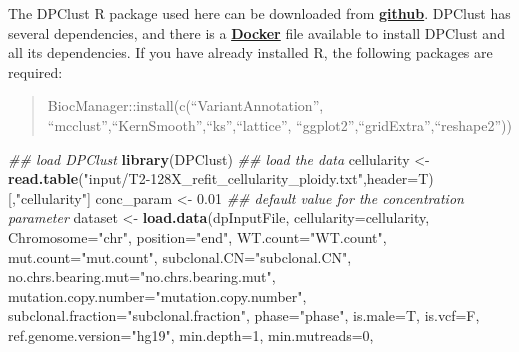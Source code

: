 \documentclass[]{article}
\newenvironment{Shaded}{\begin{snugshade}}{\end{snugshade}}
\newcommand{\CommentTok}[1]{\textcolor[rgb]{0.56,0.35,0.01}{\textit{#1}}}
\newcommand{\DataTypeTok}[1]{\textcolor[rgb]{0.13,0.29,0.53}{#1}}
\newcommand{\DecValTok}[1]{\textcolor[rgb]{0.00,0.00,0.81}{#1}}
\newcommand{\FloatTok}[1]{\textcolor[rgb]{0.00,0.00,0.81}{#1}}
\newcommand{\KeywordTok}[1]{\textcolor[rgb]{0.13,0.29,0.53}{\textbf{#1}}}
\newcommand{\NormalTok}[1]{#1}
\newcommand{\StringTok}[1]{\textcolor[rgb]{0.31,0.60,0.02}{#1}}
\begin{document}
The DPClust R package used here can be downloaded from
\href{https://github.com/Wedge-Oxford/dpclust_smchet_docker/blob/master/dpclust_v2.2.5.tar.gz}{\textbf{github}}.
DPClust has several dependencies, and there is a
\href{https://github.com/Wedge-Oxford/dpclust_smchet_docker/blob/master/Dockerfile}{\textbf{Docker}}
file available to install DPClust and all its dependencies. If you have
already installed R, the following packages are required:

\begin{quote}
BiocManager::install(c(``VariantAnnotation'',
``mcclust'',``KernSmooth'',``ks'',``lattice'',
``ggplot2'',``gridExtra'',``reshape2''))
\end{quote}

\begin{Shaded}
\begin{Highlighting}[]
\CommentTok{## load DPClust}
\KeywordTok{library}\NormalTok{(DPClust)}
\CommentTok{## load the data}
\NormalTok{cellularity <-}\StringTok{ }\KeywordTok{read.table}\NormalTok{(}\StringTok{"input/T2-128X_refit_cellularity_ploidy.txt"}\NormalTok{,}\DataTypeTok{header=}\NormalTok{T)[,}\StringTok{"cellularity"}\NormalTok{]}
\NormalTok{conc_param <-}\StringTok{ }\FloatTok{0.01} \CommentTok{## default value for the concentration parameter}
\NormalTok{dataset  <-}\StringTok{  }\KeywordTok{load.data}\NormalTok{(dpInputFile, }
                       \DataTypeTok{cellularity=}\NormalTok{cellularity, }
                       \DataTypeTok{Chromosome=}\StringTok{"chr"}\NormalTok{, }
                       \DataTypeTok{position=}\StringTok{"end"}\NormalTok{,}
                       \DataTypeTok{WT.count=}\StringTok{"WT.count"}\NormalTok{, }
                       \DataTypeTok{mut.count=}\StringTok{"mut.count"}\NormalTok{, }
                       \DataTypeTok{subclonal.CN=}\StringTok{"subclonal.CN"}\NormalTok{, }
                       \DataTypeTok{no.chrs.bearing.mut=}\StringTok{"no.chrs.bearing.mut"}\NormalTok{, }
                       \DataTypeTok{mutation.copy.number=}\StringTok{"mutation.copy.number"}\NormalTok{, }
                       \DataTypeTok{subclonal.fraction=}\StringTok{"subclonal.fraction"}\NormalTok{, }
                       \DataTypeTok{phase=}\StringTok{"phase"}\NormalTok{,}
                       \DataTypeTok{is.male=}\NormalTok{T,}
                       \DataTypeTok{is.vcf=}\NormalTok{F,}
                       \DataTypeTok{ref.genome.version=}\StringTok{"hg19"}\NormalTok{,}
                       \DataTypeTok{min.depth=}\DecValTok{1}\NormalTok{,}
                       \DataTypeTok{min.mutreads=}\DecValTok{0}\NormalTok{,}

\end{Highlighting}
\end{Shaded}
\end{document}
